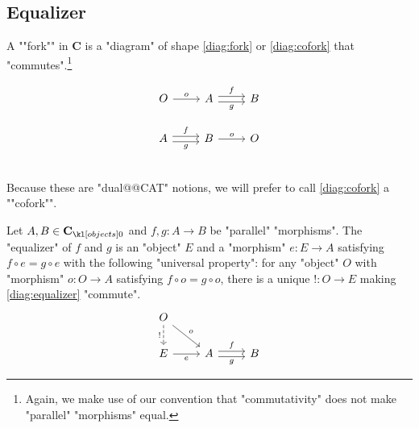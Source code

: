 \documentclass[main.tex]{subfiles}
\begin{document}
\subsection{Equalizer}%
\begin{defn}[Fork]
    \AP A ""fork"" in $\mathbf{C}$ is a "diagram" of shape \eqref{diag:fork} or \eqref{diag:cofork} that "commutes".\footnote{Again, we make use of our convention that "commutativity" does not make "parallel" "morphisms" equal.}\\
    \begin{minipage}{0.49\textwidth}
        \begin{equation}\label{diag:fork}
            \begin{tikzcd}
                O \arrow[r, "o"]                         & A \arrow[r, "f", shift left] \arrow[r, "g"', shift right] & B
            \end{tikzcd}
        \end{equation}
    \end{minipage}
    \begin{minipage}{0.49\textwidth}
        \begin{equation}\label{diag:cofork}
            \begin{tikzcd}
                A \arrow[r, "f", shift left] \arrow[r, "g"', shift right] & B \arrow[r, "o"] & O
            \end{tikzcd}
        \end{equation}
    \end{minipage}\\
    \AP Because these are "dual@@CAT" notions, we will prefer to call \eqref{diag:cofork} a ""cofork"".
\end{defn}
\begin{defn}[Equalizer]
    Let $A, B \in \obj{\mathbf{C}}$ and $f,g:A\rightarrow B$ be "parallel" "morphisms". \AP The "equalizer" of $f$ and $g$ is an "object" $E$ and a "morphism" $e:E\rightarrow A$ satisfying $f\circ e = g \circ e$ with the following "universal property": for any "object" $O$ with "morphism" $o:O\rightarrow A$ satisfying $f\circ o = g \circ o$, there is a unique $!: O \rightarrow E$ making \eqref{diag:equalizer} "commute".
    \begin{equation}\label{diag:equalizer}
        \begin{tikzcd}
            O \arrow[rd, "o"] \arrow[d, "!"', dashed] &                                                           &   \\
            E \arrow[r, "e"']                         & A \arrow[r, "f", shift left] \arrow[r, "g"', shift right] & B
            \end{tikzcd}
    \end{equation}
\end{defn}
\end{document}
